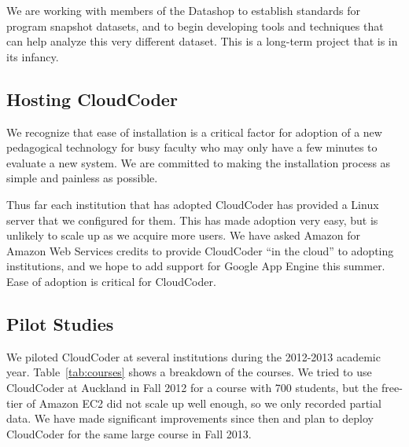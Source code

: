 \documentclass{sig-alternate}
\begin{document}
We are working with members of the Datashop to establish standards for
program snapshot datasets, and to begin developing tools and
techniques that can help analyze this very different dataset.  This is
a long-term project that is in its infancy.





\subsection{Hosting CloudCoder}
We recognize that ease of installation is a critical factor for
adoption of a new pedagogical
technology for busy
faculty who may only have a few minutes to evaluate a new system.  We
are committed to making the installation process as simple and painless as 
possible.

Thus far each institution that has adopted CloudCoder has
provided a Linux server that we configured for them.  This has made
adoption very easy, but is unlikely to scale up as we acquire more
users.  We have asked Amazon for Amazon Web Services credits to
provide CloudCoder ``in the cloud'' to adopting institutions, and we
hope to add support for Google App Engine this summer.  Ease of
adoption is critical for CloudCoder.

\subsection{Pilot Studies}

We piloted CloudCoder at several institutions during the 2012-2013
academic year.  Table~\ref{tab:courses} shows a breakdown of the
courses.  We tried to use CloudCoder at Auckland in Fall 2012 for a
course with 700 students, but the free-tier of Amazon EC2 did not
scale up well enough, so we only recorded partial data.  We have made
significant improvements since then and plan to deploy CloudCoder for
the same large course in Fall 2013.
\end{document}
